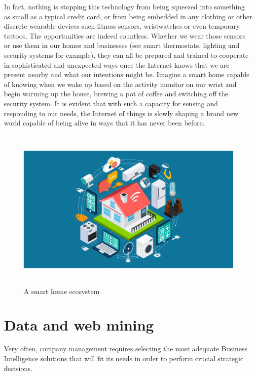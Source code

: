 In fact, nothing is stopping this technology from being squeezed into something as small as a typical credit card, or from being embedded in any clothing or other discrete wearable devices such fitness sensors, wristwatches or even temporary tattoos. The opportunities are indeed countless.
Whether we wear those sensors or use them in our homes and businesses (see smart thermostats, lighting and security systems for example), they can all be prepared and trained to cooperate in sophisticated and unexpected ways once the Internet knows that we are present nearby and what our intentions might be. Imagine a smart home capable of knowing when we wake up based on the activity monitor on our wrist and begin warming up the house, brewing a pot of coffee and switching off the security system. 
It is evident that with such a capacity for sensing and responding to our needs,  the Internet of things is slowly shaping a brand new world capable of being alive in ways that it has never been before.


\vspace{0.5cm}
\begin{figure}[htbp]
  \centering
    \includegraphics[height=8cm]{images/iot}
  \caption{A smart home ecosystem}
  \label{fig:iot}
\end{figure}
\vspace{0.5cm}

\section{Data and web mining}
\label{section:data-web-mining}
Very often, company management requires selecting the most adequate Business Intelligence solutions that will fit its needs in order to perform crucial strategic decisions.

